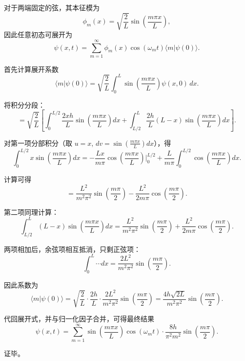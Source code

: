 \begin{solution}

\answer
对于两端固定的弦，其本征模为
\[
\phi_m(x)=\sqrt{\frac{2}{L}}\sin\!\left(\frac{m\pi x}{L}\right),
\]
因此任意初态可展开为
\[
\psi(x,t)=\sum_{m=1}^\infty \phi_m(x)\cos(\omega_m t)\langle m|\psi(0)\rangle.
\]

首先计算展开系数
\[
\langle m|\psi(0)\rangle=\sqrt{\frac{2}{L}}\int_0^L \sin\!\left(\frac{m\pi x}{L}\right)\psi(x,0)\,dx.
\]

将积分分段：
\[
=\sqrt{\frac{2}{L}}\left[\int_0^{L/2}\frac{2xh}{L}\sin\!\left(\frac{m\pi x}{L}\right)dx
+\int_{L/2}^L \frac{2h}{L}(L-x)\sin\!\left(\frac{m\pi x}{L}\right)dx\right].
\]

对第一项分部积分（取 $u=x$, $dv=\sin(\frac{m\pi x}{L})dx$），得
\[
\int_0^{L/2} x\sin\!\left(\frac{m\pi x}{L}\right)dx
=
-\frac{Lx}{m\pi}\cos\!\left(\frac{m\pi x}{L}\right)\Big|_0^{L/2}
+\frac{L}{m\pi}\int_0^{L/2}\cos\!\left(\frac{m\pi x}{L}\right)dx.
\]

计算可得
\[
=\frac{L^2}{m^2\pi^2}\sin\!\left(\frac{m\pi}{2}\right)
-\frac{L^2}{2m\pi}\cos\!\left(\frac{m\pi}{2}\right).
\]

第二项同理计算：
\[
\int_{L/2}^L (L-x)\sin\!\left(\frac{m\pi x}{L}\right)dx
=
\frac{L^2}{m^2\pi^2}\sin\!\left(\frac{m\pi}{2}\right)
+\frac{L^2}{2m\pi}\cos\!\left(\frac{m\pi}{2}\right).
\]

两项相加后，余弦项相互抵消，只剩正弦项：
\[
\int_0^L \cdots dx
=
\frac{2L^2}{m^2\pi^2}\sin\!\left(\frac{m\pi}{2}\right).
\]

因此系数为
\[
\langle m|\psi(0)\rangle
=
\sqrt{\frac{2}{L}}\cdot \frac{2h}{L}\cdot \frac{2L^2}{m^2\pi^2}
\sin\!\left(\frac{m\pi}{2}\right)
=
\frac{4h\sqrt{2L}}{m^2\pi^2}\sin\!\left(\frac{m\pi}{2}\right).
\]

代回展开式，并与归一化因子合并，可得最终结果
\[
\psi(x,t)=\sum_{m=1}^\infty \sin\!\left(\frac{m\pi x}{L}\right)\cos(\omega_m t)\cdot
\frac{8h}{\pi^2 m^2}\sin\!\left(\frac{m\pi}{2}\right).
\]

证毕。
\end{solution}
